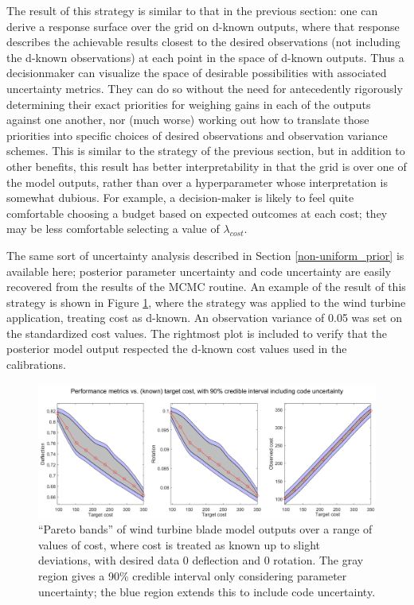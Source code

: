 \documentclass{article}
\begin{document}
The result of this strategy is similar to that in the previous section: one can derive a response surface over the grid on d-known outputs, where that response describes the achievable results closest to the desired observations (not including the d-known observations) at each point in the space of d-known outputs. Thus a decisionmaker can visualize the space of desirable possibilities with associated uncertainty metrics. They can do so without the need for antecedently rigorously determining their exact priorities for weighing gains in each of the outputs against one another, nor (much worse) working out how to translate those priorities into specific choices of desired observations and observation variance schemes. This is similar to the strategy of the previous section, but in addition to other benefits, this result has better interpretability in that the grid is over one of the model outputs, rather than over a hyperparameter whose interpretation is somewhat dubious. For example, a decision-maker is likely to feel quite comfortable choosing a budget based on expected outcomes at each cost; they may be less comfortable selecting a value of $\lambda_{cost}$.

The same sort of uncertainty analysis described in Section \ref{non-uniform_prior} is available here; posterior parameter uncertainty and code uncertainty are easily recovered from the results of the MCMC routine. An example of the result of this strategy is shown in Figure \ref{fig:known_cost}, where the strategy was applied to the wind turbine application, treating cost as d-known. An observation variance of 0.05 was set on the standardized cost values. The rightmost plot is included to verify that the posterior model output respected the d-known cost values used in the calibrations.

\begin{figure}
\centering
\includegraphics[width=.9\linewidth]{FIG_costs_code_uncert}
\captionsetup{width=.9\linewidth}
\caption{``Pareto bands'' of wind turbine blade model outputs over a range of values of cost, where cost is treated as known up to slight deviations, with desired data 0 deflection and 0 rotation. The gray region gives a 90\% credible interval only considering parameter uncertainty; the blue region extends this to include code uncertainty.}
\label{fig:known_cost}
\end{figure}
\end{document}
